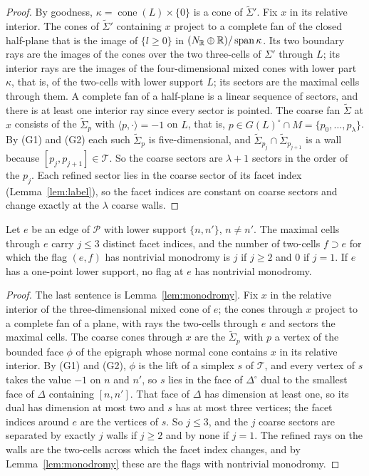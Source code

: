 \begin{proof}
By goodness, $\kappa=\operatorname{cone}(L)\times\{0\}$ is a cone of $\widetilde\Sigma'$. Fix $x$ in its relative interior. The
cones of $\widetilde\Sigma'$ containing $x$ project to a complete fan of the closed half-plane that is the image of $\{l\ge0\}$ in
$(N_\mathbb R\oplus\mathbb R)/\operatorname{span}\kappa$. Its two boundary rays are the images of the cones over the two three-cells of
$\Sigma'$ through $L$; its interior rays are the images of the four-dimensional mixed cones with lower part $\kappa$, that is,
of the two-cells with lower support $L$; its sectors are the maximal cells through them. A complete fan of a half-plane is a
linear sequence of sectors, and there is at least one interior ray since every sector is pointed. The coarse fan
$\widetilde\Sigma$ at $x$ consists of the $\widetilde\Sigma_p$ with $\langle p,\cdot\rangle=-1$ on $L$, that is,
$p\in G(L)^\circ\cap M=\{p_0,\dots,p_\lambda\}$. By (G1) and (G2) each such $\widetilde\Sigma_p$ is five-dimensional, and
$\widetilde\Sigma_{p_j}\cap\widetilde\Sigma_{p_{j+1}}$ is a wall because $[p_j,p_{j+1}]\in\mathcal T$. So the coarse sectors are
$\lambda+1$ sectors in the order of the $p_j$. Each refined sector lies in the coarse sector of its facet index
(Lemma~\ref{lem:label}), so the facet indices are constant on coarse sectors and change exactly at the $\lambda$ coarse
walls.
\end{proof}

\begin{lemma}\label{lem:edge}
Let $e$ be an edge of $\mathscr P$ with lower support $\{n,n'\}$, $n\neq n'$. The maximal cells through $e$ carry $j\le3$ distinct
facet indices, and the number of two-cells $f\supset e$ for which the flag $(e,f)$ has nontrivial monodromy is $j$ if $j\ge2$
and $0$ if $j=1$. If $e$ has a one-point lower support, no flag at $e$ has nontrivial monodromy.
\end{lemma}

\begin{proof}
The last sentence is Lemma~\ref{lem:monodromy}. Fix $x$ in the relative interior of the three-dimensional mixed cone of $e$;
the cones through $x$ project to a complete fan of a plane, with rays the two-cells through $e$ and sectors the maximal cells.
The coarse cones through $x$ are the $\widetilde\Sigma_p$ with $p$ a vertex of the bounded face $\phi$ of the epigraph whose
normal cone contains $x$ in its relative interior. By (G1) and (G2), $\phi$ is the lift of a simplex $s$ of $\mathcal T$, and every
vertex of $s$ takes the value $-1$ on $n$ and $n'$, so $s$ lies in the face of $\Delta^\circ$ dual to the smallest face of $\Delta$
containing $[n,n']$. That face of $\Delta$ has dimension at least one, so its dual has dimension at most two and $s$ has at
most three vertices; the facet indices around $e$ are the vertices of $s$. So $j\le3$, and the $j$ coarse sectors are separated
by exactly $j$ walls if $j\ge2$ and by none if $j=1$. The refined rays on the walls are the two-cells across which the facet
index changes, and by Lemma~\ref{lem:monodromy} these are the flags with nontrivial monodromy.
\end{proof}

